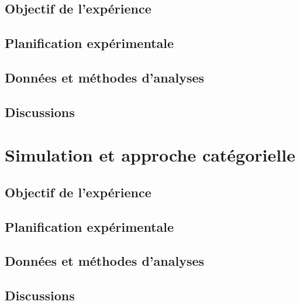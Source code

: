 \subsection{Objectif de l'expérience}

\subsection{Planification expérimentale}

\subsection{Données et méthodes d'analyses}

\subsection{Discussions}

\section{Simulation et approche catégorielle}
\label{sec:xp4}

\subsection{Objectif de l'expérience}

\subsection{Planification expérimentale}

\subsection{Données et méthodes d'analyses}

\subsection{Discussions}




